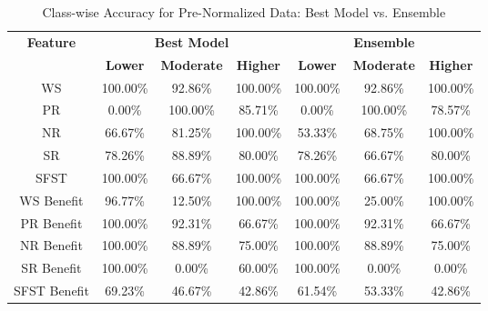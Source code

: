 \begin{table}[H]
\centering
\begin{tabular}{|c|c|c|c|c|c|c|}
\hline
\multirow{2}{*}{\textbf{Feature}} & \multicolumn{3}{c|}{\textbf{Best Model}} & \multicolumn{3}{c|}{\textbf{Ensemble}} \\
\cline{2-7}
 & \textbf{Lower} & \textbf{Moderate} & \textbf{Higher} & \textbf{Lower} & \textbf{Moderate} & \textbf{Higher} \\
\hline
WS & 100.00\% & 92.86\% & 100.00\% & 100.00\% & 92.86\% & 100.00\% \\
\hline
PR & 0.00\% & 100.00\% & 85.71\% & 0.00\% & 100.00\% & 78.57\% \\
\hline
NR & 66.67\% & 81.25\% & 100.00\% & 53.33\% & 68.75\% & 100.00\% \\
\hline
SR & 78.26\% & 88.89\% & 80.00\% & 78.26\% & 66.67\% & 80.00\% \\
\hline
SFST & 100.00\% & 66.67\% & 100.00\% & 100.00\% & 66.67\% & 100.00\% \\
\hline
WS Benefit & 96.77\% & 12.50\% & 100.00\% & 100.00\% & 25.00\% & 100.00\% \\
\hline
PR Benefit & 100.00\% & 92.31\% & 66.67\% & 100.00\% & 92.31\% & 66.67\% \\
\hline
NR Benefit & 100.00\% & 88.89\% & 75.00\% & 100.00\% & 88.89\% & 75.00\% \\
\hline
SR Benefit & 100.00\% & 0.00\% & 60.00\% & 100.00\% & 0.00\% & 0.00\% \\
\hline
SFST Benefit & 69.23\% & 46.67\% & 42.86\% & 61.54\% & 53.33\% & 42.86\% \\
\hline
\end{tabular}
\caption{Class-wise Accuracy for Pre-Normalized Data: Best Model vs. Ensemble}
\label{reg_spec_tab:pre_norm_accuracy}
\end{table}
